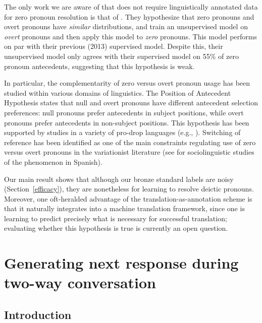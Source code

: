 \documentclass[11pt]{report}
\begin{document}
The only work we are aware of that does not require linguistically annotated data for zero pronoun resolution is that of \cite{chenchinese}. They hypothesize that zero pronouns and overt pronouns have \emph{similar} distributions, and train an unsupervised model on \emph{overt} pronouns and then apply this model to \emph{zero} pronouns. This model performs on par with their previous (2013) supervised model. Despite this, their unsupervised model only agrees with their supervised model on 55\% of zero pronoun antecedents, suggesting that this hypothesis is weak.

In particular, the complementarity of zero versus overt pronoun usage has been studied within various domains of linguistics. The Position of Antecedent Hypothesis \cite{carminati2002processing} states that null and overt pronouns have different antecedent selection preferences: null pronouns prefer antecedents in subject positions, while overt pronouns prefer antecedents in non-subject positions. This hypothesis has been supported by studies in a variety of pro-drop languages (e.g., \cite{alonso2002null} \cite{kweon2011processing}). Switching of reference has been identified as one of the main constraints regulating use of zero versus overt pronouns in the variationist literature (see \cite{cameron1992pronominal} for sociolinguistic studies of the phenomenon in Spanish).%

Our main result shows that although our bronze standard labels are noisy (Section~\ref{efficacy}), they are nonetheless for learning to resolve deictic pronouns. Moreover, one oft-heralded advantage of the translation-as-annotation scheme \cite{carpuat07psd} is that it naturally integrates into a machine translation framework, since one is learning to predict precisely what is necessary for successful translation; evaluating whether this hypothesis is true is currently an open question.


\newpage

\chapter{Generating next response during two-way conversation}\label{dialogue_next_response}

\section{Introduction}
\end{document}
